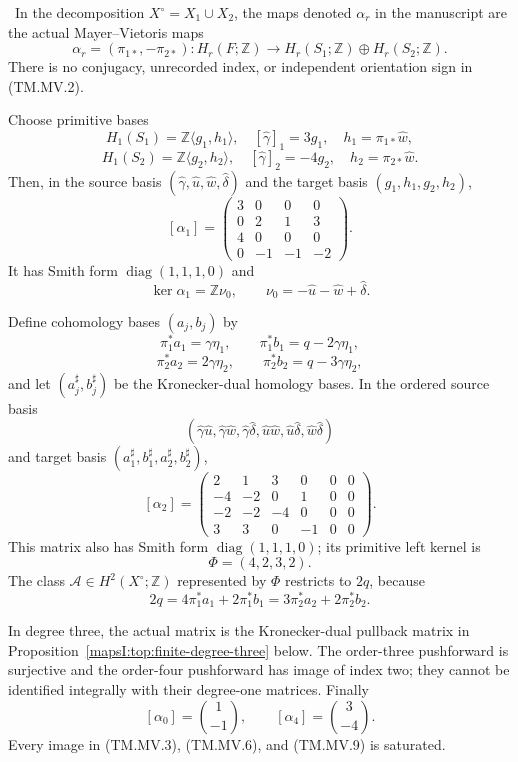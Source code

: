 \begin{proposition}
\label{mapsI:top:prop:actual-finite-band-maps}
\ In the decomposition $X^\circ=X_1\cup X_2$, the maps denoted
$\alpha_r$ in the manuscript are the actual Mayer--Vietoris maps
\[
 \alpha_r=(\pi_{1*},-\pi_{2*}):
 H_r(F;\mathbb Z)\longrightarrow
 H_r(S_1;\mathbb Z)\oplus H_r(S_2;\mathbb Z).
\tag{TM.MV.2}
\]
There is no conjugacy, unrecorded index, or independent orientation sign in
(TM.MV.2).

Choose primitive bases
\[
 H_1(S_1)=\mathbb Z\langle g_1,h_1\rangle,
 \quad [\widehat\gamma]_1=3g_1,\quad
 h_1=\pi_{1*}\widehat w,
\]
\[
 H_1(S_2)=\mathbb Z\langle g_2,h_2\rangle,
 \quad [\widehat\gamma]_2=-4g_2,\quad
 h_2=\pi_{2*}\widehat w.
\]
Then, in the source basis
$(\widehat\gamma,\widehat u,\widehat w,\widehat\delta)$ and the target
basis $(g_1,h_1,g_2,h_2)$,
\[
 [\alpha_1]=
 \begin{pmatrix}
 3&0&0&0\\
 0&2&1&3\\
 4&0&0&0\\
 0&-1&-1&-2
 \end{pmatrix}.
\tag{TM.MV.3}
\]
It has Smith form $\operatorname{diag}(1,1,1,0)$ and
\[
 \ker\alpha_1=\mathbb Z\nu_0,
 \qquad
 \nu_0=-\widehat u-\widehat w+\widehat\delta.
\tag{TM.MV.4}
\]

Define cohomology bases $(a_j,b_j)$ by
\[
 \pi_1^*a_1=\gamma\eta_1,
 \qquad \pi_1^*b_1=q-2\gamma\eta_1,
\]
\[
 \pi_2^*a_2=2\gamma\eta_2,
 \qquad \pi_2^*b_2=q-3\gamma\eta_2,
\tag{TM.MV.5}
\]
and let $(a_j^\sharp,b_j^\sharp)$ be the Kronecker-dual homology bases.
In the ordered source basis
\[
(\widehat\gamma\widehat u,
 \widehat\gamma\widehat w,
 \widehat\gamma\widehat\delta,
 \widehat u\widehat w,
 \widehat u\widehat\delta,
 \widehat w\widehat\delta)
\]
and target basis
$(a_1^\sharp,b_1^\sharp,a_2^\sharp,b_2^\sharp)$,
\[
 [\alpha_2]=
 \begin{pmatrix}
  2& 1& 3& 0&0&0\\
 -4&-2& 0& 1&0&0\\
 -2&-2&-4& 0&0&0\\
  3& 3& 0&-1&0&0
 \end{pmatrix}.
\tag{TM.MV.6}
\]
This matrix also has Smith form $\operatorname{diag}(1,1,1,0)$; its
primitive left kernel is
\[
 \Phi=(4,2,3,2).
\tag{TM.MV.7}
\]
The class $\mathcal A\in H^2(X^\circ;\mathbb Z)$ represented by $\Phi$
restricts to $2q$, because
\[
 2q=4\pi_1^*a_1+2\pi_1^*b_1
    =3\pi_2^*a_2+2\pi_2^*b_2.
\tag{TM.MV.8}
\]

In degree three, the actual matrix is the Kronecker-dual pullback matrix
in Proposition~\ref{mapsI:top:finite-degree-three} below. The order-three
pushforward is surjective and the order-four pushforward has image of index
two; they cannot be identified integrally with their degree-one matrices.
Finally
\[
 [\alpha_0]=\binom{1}{-1},
 \qquad
 [\alpha_4]=\binom{3}{-4}.
\tag{TM.MV.9}
\]
Every image in (TM.MV.3), (TM.MV.6), and (TM.MV.9) is saturated.
\end{proposition}

